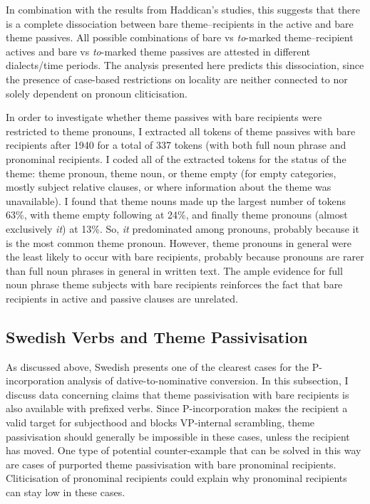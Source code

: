 In combination with the results from Haddican's studies, this suggests that there is a complete dissociation between bare theme--recipients in the active and bare theme passives. All possible combinations of bare vs \textit{to}-marked theme--recipient actives and bare vs \textit{to}-marked theme passives are attested in different dialects/time periods. The analysis presented here predicts this dissociation, since the presence of case-based restrictions on locality are neither connected to nor solely dependent on pronoun cliticisation.

In order to investigate whether theme passives with bare recipients were restricted to theme pronouns, I extracted all tokens of theme passives with bare recipients after 1940 for a total of 337 tokens (with both full noun phrase and pronominal recipients. I coded all of the extracted tokens for the status of the theme: theme pronoun, theme noun, or theme empty (for empty categories, mostly subject relative clauses, or where information about the theme was unavailable). I found that theme nouns made up the largest number of tokens 63\%, with theme empty following at 24\%, and finally theme pronouns (almost exclusively \textit{it}) at 13\%. So, \textit{it} predominated among pronouns, probably because it is the most common theme pronoun. However, theme pronouns in general were the least likely to occur with bare recipients, probably because pronouns are rarer than full noun phrases in general in written text. The ample evidence for full noun phrase theme subjects with bare recipients reinforces the fact that bare recipients in active and passive clauses are unrelated.

\subsection{Swedish Verbs and Theme Passivisation}
As discussed above, Swedish presents one of the clearest cases for the P-incorporation analysis of dative-to-nominative conversion. In this subsection, I discuss data concerning claims that theme passivisation with bare recipients is also available with prefixed verbs. Since P-incorporation makes the recipient a valid target for subjecthood and blocks VP-internal scrambling, theme passivisation should generally be impossible in these cases, unless the recipient has moved. One type of potential counter-example that can be solved in this way are cases of purported theme passivisation with bare pronominal recipients. Cliticisation of pronominal recipients could explain why pronominal recipients can stay low in these cases.

